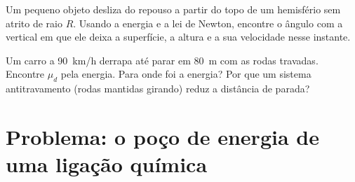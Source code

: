 \begin{exercise}[$\star\star\star$]\label{exo:b1:work-and-energy:11}
Um pequeno objeto desliza do repouso a partir do topo de um hemisfério sem atrito
de raio $R$. Usando a energia e a lei de Newton, encontre o ângulo com a
vertical em que ele deixa a superfície, a altura e a sua velocidade
nesse instante.
\end{exercise}

\begin{exercise}[$\star\star\star$]\label{exo:b1:work-and-energy:12}
Um carro a \qty{90}{km/h} derrapa até parar em \qty{80}{m} com as rodas
travadas. Encontre $\mu_d$ pela energia. Para onde foi a energia? Por que um
sistema antitravamento (rodas mantidas girando) reduz a distância de parada?
\end{exercise}

\section{Problema: o poço de energia de uma ligação química}

